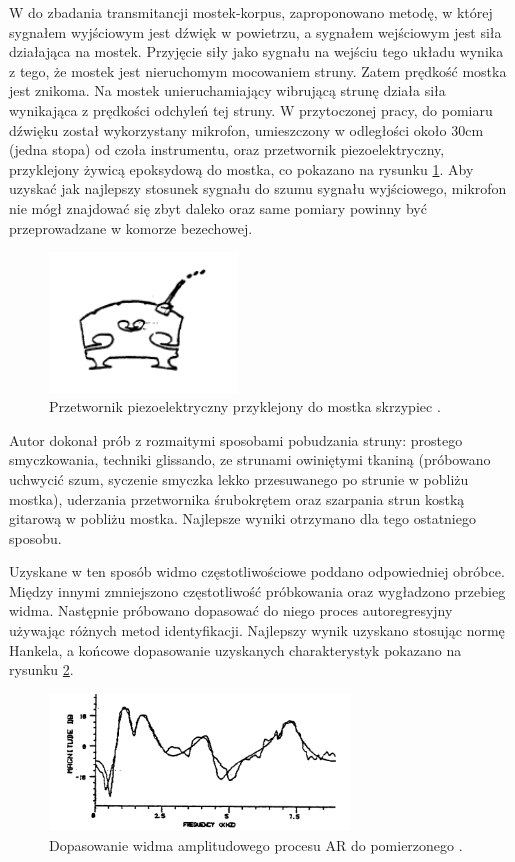 W \cite{bowed_smith} do zbadania transmitancji mostek-korpus, zaproponowano metodę, w której sygnałem wyjściowym jest dźwięk w powietrzu, a sygnałem wejściowym jest siła działająca na mostek. Przyjęcie siły jako sygnału na wejściu tego układu wynika z tego, że mostek jest nieruchomym mocowaniem struny. Zatem prędkość mostka jest znikoma. Na mostek unieruchamiający wibrującą strunę działa siła wynikająca z prędkości odchyleń tej struny. W przytoczonej pracy, do pomiaru dźwięku został wykorzystany mikrofon, umieszczony w odległości około 30cm (jedna stopa) od czoła instrumentu, oraz przetwornik piezoelektryczny, przyklejony żywicą epoksydową do mostka, co pokazano na rysunku \ref{rys:pomiary}. Aby uzyskać jak najlepszy stosunek sygnału do szumu sygnału wyjściowego, mikrofon nie mógł znajdować się zbyt daleko oraz same pomiary powinny być przeprowadzane w komorze bezechowej.

\begin{figure}[H]
	\centering
	\includegraphics[width=5cm]{grafiki/pomiary}
	\captionsetup{justification=centering}
	\caption{Przetwornik piezoelektryczny przyklejony do mostka skrzypiec \cite{bowed_smith}.}
	\label{rys:pomiary}
\end{figure}

Autor \cite{bowed_smith} dokonał prób z rozmaitymi sposobami pobudzania struny: prostego smyczkowania, techniki glissando, ze strunami owiniętymi tkaniną (próbowano uchwycić szum, syczenie smyczka lekko przesuwanego po strunie w pobliżu mostka), uderzania przetwornika śrubokrętem oraz szarpania strun kostką gitarową w pobliżu mostka. Najlepsze wyniki otrzymano dla tego ostatniego sposobu.

Uzyskane w ten sposób widmo częstotliwościowe poddano odpowiedniej obróbce. Między innymi zmniejszono częstotliwość próbkowania oraz wygładzono przebieg widma. Następnie próbowano dopasować do niego proces autoregresyjny używając różnych metod identyfikacji. Najlepszy wynik uzyskano stosując normę Hankela, a końcowe dopasowanie uzyskanych charakterystyk pokazano na rysunku \ref{rys:hankel}.

\begin{figure}[H]
	\centering
	\includegraphics[width=8cm]{grafiki/hankel}
	\captionsetup{justification=centering}
	\caption{Dopasowanie widma amplitudowego procesu AR do pomierzonego \cite{bowed_smith}.}
	\label{rys:hankel}
\end{figure}

